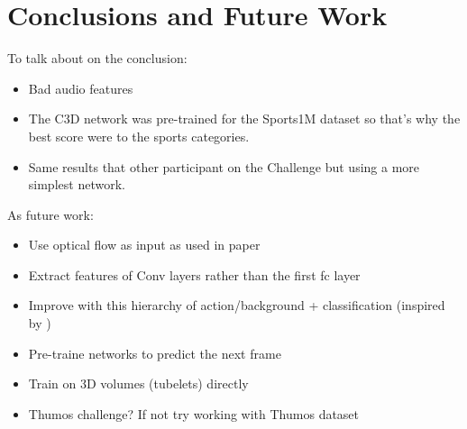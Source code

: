 \chapter{Conclusions and Future Work}

To talk about on the conclusion:
\begin{itemize}
	\item Bad audio features
    \item The C3D network was pre-trained for the Sports1M dataset so that's why the best score were to the sports categories.
    \item Same results that other participant on the Challenge but using a more simplest network.
\end{itemize}


As future work:
\begin{itemize}
    \item Use optical flow as input as used in paper \cite{simonyan2014two}\cite{Ng_2015_CVPR}\cite{Yao_2015_ICCV}
    \item Extract features of Conv layers rather than the first fc layer
    \item Improve with this hierarchy of action/background + classification (inspired by \cite{shoutemporal})
    \item Pre-traine networks to predict the next frame
    \item Train on 3D volumes (tubelets) directly
    \item Thumos challenge? If not try working with Thumos dataset\cite{THUMOS15}
\end{itemize}
